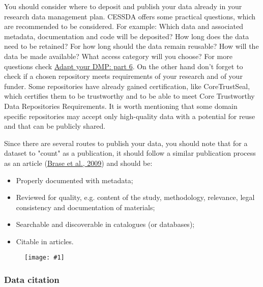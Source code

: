 \documentclass{article}
\newlength{\imgwidth}
\newcommand\scaledgraphics[2]{%
                
\settowidth{\imgwidth}{\texttt{[image: \#1]}}%
                
\setlength{\imgwidth}{\minof{\imgwidth}{#2\textwidth}}%
                
\texttt{[image: \#1]}%
                
}
\begin{document}
You should consider where to deposit and publish your data already in your research data management plan. CESSDA offers some practical questions, which are recommended to be considered. For example: Which data and associated metadata, documentation and code will be deposited? How long does the data need to be retained? For how long should the data remain reusable? How will the data be made available? What access category will you choose? For more questions check \href{https://www.cessda.eu/Research-Infrastructure/Training/Expert-Tour-Guide-on-Data-Management/6.-Archive-Publish/Adapt-your-DMP-part-6}{Adapt your DMP: part 6}. On the other hand don’t forget to check if a chosen repository meets requirements of your research and of your funder. Some repositories have already gained certification, like CoreTrustSeal, which certifies them to be trustworthy and to be able to meet Core Trustworthy Data Repositories Requirements. It is worth mentioning that some domain specific repositories may accept only high-quality data with a potential for reuse and that can be publicly shared.


Since there are several routes to publish your data, you should note that for a dataset to "count" as a publication, it should follow a similar publication process as an article (\href{https://doi.org/10.3233/ISU-2009-0595}{Brase et al., 2009}) and should be:

\begin{itemize}
\item Properly documented with metadata;


\item Reviewed for quality, e.g. content of the study, methodology, relevance, legal consistency and documentation of materials;


\item Searchable and discoverable in catalogues (or databases);


\item Citable in articles.


\end{itemize}
\begin{figure}
\scaledgraphics{d7fb9fbc-5882-4ea3-8f19-feabbe374223.png}{1}
\label{F56007681}
\end{figure}


\subsubsection{\textbf{Data citation}}\label{data-citation}
\end{document}

